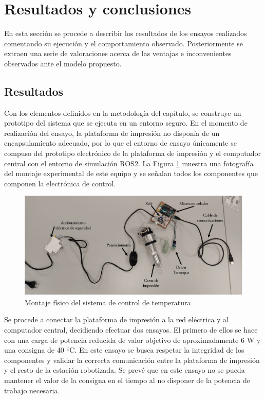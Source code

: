 \section{Resultados y conclusiones}
En esta sección se procede a describir los resultados de los ensayos realizados comentando su ejecución y el comportamiento observado. Posteriormente se extraen una serie de valoraciones acerca de las ventajas e inconvenientes observados ante el modelo propuesto.

\subsection{Resultados}
Con los elementos definidos en la metodología del capítulo, se construye un prototipo del sistema que se ejecuta en un entorno seguro. En el momento de realización del ensayo, la plataforma de impresión no disponía de un encapsulamiento adecuado, por lo que el entorno de ensayo únicamente se compuso del prototipo electrónico de la plataforma de impresión y el computador central con el entorno de simulación ROS2. La Figura \ref{fig:montaje_termopar} muestra una fotografía del montaje experimental de este equipo y se señalan todos los componentes que componen la electrónica de control.

\begin{figure}[H]
    \centering
    \includegraphics[scale=0.30]{figuras/montaje ensayo control temperatura.jpg}
    \caption{Montaje físico del sistema de control de temperatura}
    \label{fig:montaje_termopar}
\end{figure}

Se procede a conectar la plataforma de impresión a la red eléctrica y al computador central, decidiendo efectuar dos ensayos. El primero de ellos se hace con una carga de potencia reducida de valor objetivo de aproximadamente 6 W y una consigna de 40 ºC. En este ensayo se busca respetar la integridad de los componentes y validar la correcta comunicación entre la plataforma de impresión y el resto de la estación robotizada. Se prevé que en este ensayo no se pueda mantener el valor de la consigna en el tiempo al no disponer de la potencia de trabajo necesaria. 

